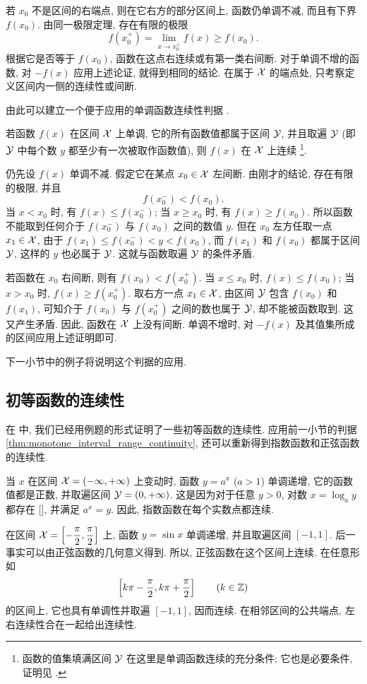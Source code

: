 若 $x_0$ 不是区间的右端点, 则在它右方的部分区间上,
函数仍单调不减, 而且有下界 $f(x_0)$.
由同一极限定理, 存在有限的极限
$$
f(x_0^+)=\lim_{x\to x_0^+}f(x)\geq f(x_0).
$$
根据它是否等于 $f(x_0)$, 函数在这点右连续或有第一类右间断.
对于单调不增的函数, 对 $-f(x)$ 应用上述论证, 就得到相同的结论.
在属于 $\mathcal{X}$ 的端点处, 只考察定义区间内一侧的连续性或间断.

由此可以建立一个便于应用的单调函数连续性判据
.

\myrefparagraph{2\textdegree}\label{thm:monotone_interval_range_continuity}
{\kaishu 若函数 $f(x)$ 在区间 $\mathcal{X}$ 上单调,
它的所有函数值都属于区间 $\mathcal{Y}$, 并且取遍 $\mathcal{Y}$
(即 $\mathcal{Y}$ 中每个数 $y$ 都至少有一次被取作函数值),
则 $f(x)$ 在 $\mathcal{X}$ 上连续}
\footnote{函数的值集填满区间 $\mathcal{Y}$ 在这里是单调函数连续的充分条件;
它也是必要条件, 证明见 .}.

仍先设 $f(x)$ 单调不减. 假定它在某点 $x_0\in\mathcal{X}$ 左间断.
由刚才的结论, 存在有限的极限, 并且
$$
f(x_0^-)<f(x_0).
$$
当 $x<x_0$ 时, 有 $f(x)\leq f(x_0^-)$;
当 $x\geq x_0$ 时, 有 $f(x)\geq f(x_0)$.
所以函数不能取到任何介于 $f(x_0^-)$ 与 $f(x_0)$ 之间的数值 $y$.
但在 $x_0$ 左方任取一点 $x_1\in\mathcal{X}$,
由于 $f(x_1)\leq f(x_0^-)<y<f(x_0)$,
而 $f(x_1)$ 和 $f(x_0)$ 都属于区间 $\mathcal{Y}$, 这样的 $y$ 也必属于 $\mathcal{Y}$.
这就与函数取遍 $\mathcal{Y}$ 的条件矛盾.

若函数在 $x_0$ 右间断, 则有 $f(x_0)<f(x_0^+)$.
当 $x\leq x_0$ 时, $f(x)\leq f(x_0)$;
当 $x>x_0$ 时, $f(x)\geq f(x_0^+)$.
取右方一点 $x_1\in\mathcal{X}$, 由区间 $\mathcal{Y}$ 包含 $f(x_0)$ 和 $f(x_1)$,
可知介于 $f(x_0)$ 与 $f(x_0^+)$ 之间的数也属于 $\mathcal{Y}$,
却不能被函数取到. 这又产生矛盾.
因此, 函数在 $\mathcal{X}$ 上没有间断.
单调不增时, 对 $-f(x)$ 及其值集所成的区间应用上述证明即可.

下一小节中的例子将说明这个判据的应用.

\subsection{初等函数的连续性}\label{subsec:72}
在  中, 我们已经用例题的形式证明了一些初等函数的连续性.
应用前一小节的判据 \ref{thm:monotone_interval_range_continuity},
还可以重新得到指数函数和正弦函数的连续性.

当 $x$ 在区间 $\mathcal{X}=(-\infty,+\infty)$ 上变动时,
函数 $y=a^x$ ($a>1$) 单调递增, 它的函数值都是正数, 并取遍区间
$\mathcal{Y}=(0,+\infty)$.
这是因为对于任意 $y>0$, 对数 $x=\log_a y$ 都存在
[], 并满足 $a^x=y$.
因此, 指数函数在每个实数点都连续.

在区间 $\mathcal{X}=\left[ -\dfrac\pi2,\dfrac\pi2 \right]$ 上,
函数 $y=\sin x$ 单调递增, 并且取遍区间 $[-1,1]$.
后一事实可以由正弦函数的几何意义得到.
所以, 正弦函数在这个区间上连续.
在任意形如
$$
\left[ k\pi-\frac\pi2,k\pi+\frac\pi2 \right]\qquad(k\in\mathbb{Z})
$$
的区间上, 它也具有单调性并取遍 $[-1,1]$, 因而连续.
在相邻区间的公共端点, 左右连续性合在一起给出连续性.

